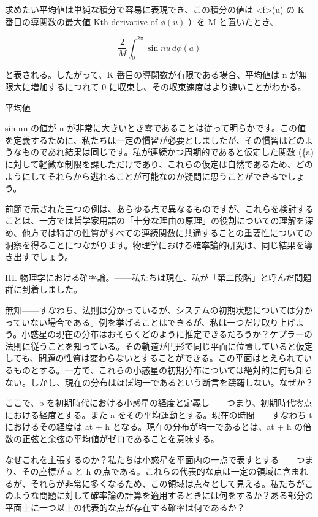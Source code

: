 \documentclass[a4paper,11pt,openany]{ltjsbook}
\begin{document}
求めたい平均値は単純な積分で容易に表現でき、この積分の値は <f>(u) の K 番目の導関数の最大値 Kth derivative of \(\phi(u)\) ）を M と置いたとき、

\[\frac{2}{M} \int_0^{2\pi} \sin nu \, d\phi(a)\]

と表される。したがって、K 番目の導関数が有限である場合、平均値は n が無限大に増加するにつれて 0 に収束し、その収束速度はより速いことがわかる。

平均値

sin nn の値が n が非常に大きいとき零であることは従って明らかです。この値を定義するために、私たちは一定の慣習が必要としましたが、その慣習はどのようなものであれ結果は同じです。私が連続かつ周期的であると仮定した関数 (\{a) に対して軽微な制限を課しただけであり、これらの仮定は自然であるため、どのようにしてそれらから逃れることが可能なのか疑問に思うことができるでしょう。

前節で示された三つの例は、あらゆる点で異なるものですが、これらを検討することは、一方では哲学家用語の「十分な理由の原理」の役割についての理解を深め、他方では特定の性質がすべての連続関数に共通することの重要性についての洞察を得ることにつながります。物理学における確率論的研究は、同じ結果を導き出すでしょう。

III. 物理学における確率論。——私たちは現在、私が「第二段階」と呼んだ問題群に到着しました。

無知——すなわち、法則は分かっているが、システムの初期状態については分かっていない場合である。例を挙げることはできるが、私は一つだけ取り上げよう。小惑星の現在の分布はおそらくどのように推定できるだろうか？ケプラーの法則に従うことを知っている。その軌道が円形で同じ平面に位置していると仮定しても、問題の性質は変わらないとすることができる。この平面はとえられているものとする。一方で、これらの小惑星の初期分布については絶対的に何も知らない。しかし、現在の分布はほぼ均一であるという断言を躊躇しない。なぜか？

ここで、b を初期時代における小惑星の経度と定義し——つまり、初期時代零点における経度とする。また a をその平均運動とする。現在の時間——すなわち t におけるその経度は at + h となる。現在の分布が均一であるとは、at + h の倍数の正弦と余弦の平均値がゼロであることを意味する。

なぜこれを主張するのか？私たちは小惑星を平面内の一点で表すとする——つまり、その座標が a と h の点である。これらの代表的な点は一定の領域に含まれるが、それらが非常に多くなるため、この領域は点々として見える。私たちがこのような問題に対して確率論の計算を適用するときには何をするか？ある部分の平面上に一つ以上の代表的な点が存在する確率は何であるか？
\end{document}

